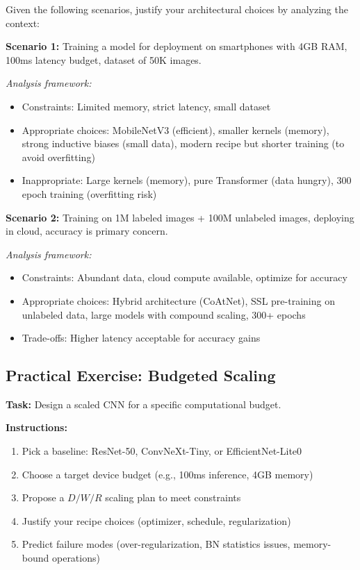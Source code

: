 \documentclass{article}
\begin{document}
Given the following scenarios, justify your architectural choices by analyzing the context:

\textbf{Scenario 1:} Training a model for deployment on smartphones with 4GB RAM, 100ms latency budget, dataset of 50K images.

\textit{Analysis framework:}
\begin{itemize}
    \item Constraints: Limited memory, strict latency, small dataset
    \item Appropriate choices: MobileNetV3 (efficient), smaller kernels (memory), strong inductive biases (small data), modern recipe but shorter training (to avoid overfitting)
    \item Inappropriate: Large kernels (memory), pure Transformer (data hungry), 300 epoch training (overfitting risk)
\end{itemize}

\textbf{Scenario 2:} Training on 1M labeled images + 100M unlabeled images, deploying in cloud, accuracy is primary concern.

\textit{Analysis framework:}
\begin{itemize}
    \item Constraints: Abundant data, cloud compute available, optimize for accuracy
    \item Appropriate choices: Hybrid architecture (CoAtNet), SSL pre-training on unlabeled data, large models with compound scaling, 300+ epochs
    \item Trade-offs: Higher latency acceptable for accuracy gains
\end{itemize}

\subsection{Practical Exercise: Budgeted Scaling}

\textbf{Task:} Design a scaled CNN for a specific computational budget.

\textbf{Instructions:}
\begin{enumerate}
    \item Pick a baseline: ResNet-50, ConvNeXt-Tiny, or EfficientNet-Lite0
    \item Choose a target device budget (e.g., 100ms inference, 4GB memory)
    \item Propose a $D/W/R$ scaling plan to meet constraints
    \item Justify your recipe choices (optimizer, schedule, regularization)
    \item Predict failure modes (over-regularization, BN statistics issues, memory-bound operations)
\end{enumerate}
\end{document}
